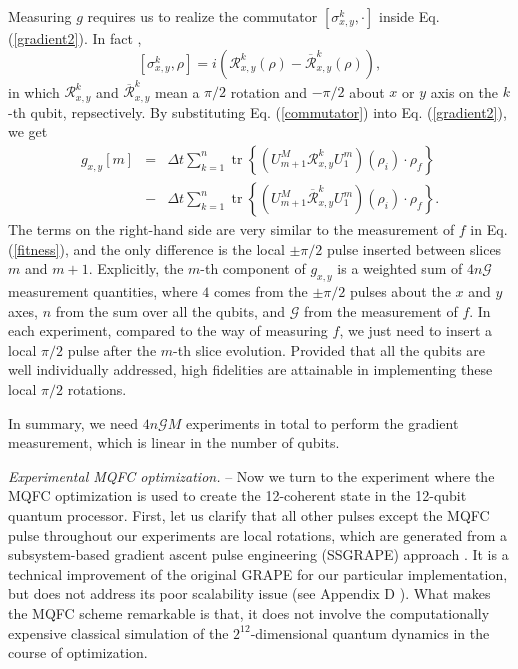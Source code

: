 \documentclass[twocolumn,reprint, amsmath,amssymb,showpacs,superscriptaddress]{revtex4-1}
\newcommand{\bea}{\begin{eqnarray}}
\newcommand{\eea}{\end{eqnarray}}
\begin{document}
Measuring $g$ requires us to  realize the commutator $[\sigma^k_{x,y}, \cdot]$ inside Eq. (\ref{gradient2}). In fact \cite{li2016physical},
\begin{equation}
\left[ \sigma_{x,y}^k,\rho  \right] =  i \left(\mathcal{R}_{x,y}^{k} \left(\rho \right)   - \overline{\mathcal{R}}_{x,y}^{k} \left(\rho \right)  \right),
\label{commutator}
\end{equation}
in which $\mathcal{R}_{x,y}^{k}$ and $\overline{\mathcal{R}}_{x,y}^{k}$ mean a $\pi/2$ rotation and $-\pi/2$ about $x$ or $y$ axis on the $k$-th qubit, repsectively. By substituting Eq. (\ref{commutator}) into Eq. (\ref{gradient2}), we get
\bea
g_{x,y}[m]  & = &    \Delta t \sum\limits_{k = 1}^n  \operatorname{tr}   \left\{  \left(U_{m+1}^{M}   \mathcal{R}_{x,y}^{k} U_{1}^{m}\right)  (\rho _i) \cdot \rho_f \right\}  \nonumber \\
&-&\Delta t  \sum\limits_{k = 1}^n  \operatorname{tr} \left\{ \left(U_{m+1}^{M}  \overline{\mathcal{R}}_{x,y}^{k} U_{1}^{m}\right) (\rho _i)      \cdot \rho_f \right\}.
\label{g}
\eea
The terms on the right-hand side are very similar to the measurement of $f$ in Eq. (\ref{fitness}), and the only difference is the local $\pm \pi/2$ pulse inserted between slices $m$ and $m+1$. Explicitly, the $m$-th component of $g_{x,y}$ is a weighted sum of $4n\mathcal{G}$ measurement quantities, where $4$ comes from the $\pm \pi/2$ pulses about the $x$ and $y$ axes, $n$ from the sum over all the qubits, and $\mathcal{G}$ from the measurement of $f$. In each experiment, compared to the way of measuring $f$, we just need to insert a local $ \pi/2 $ pulse after the $m$-th slice evolution.  Provided that all the qubits are well individually addressed, high fidelities are attainable in implementing these local $ \pi/2 $ rotations.

In summary, we need $4n \mathcal{G}M$ experiments in total to perform the gradient measurement, which is linear in  the number of qubits.

\emph{Experimental MQFC optimization.} -- Now we turn to the experiment where the MQFC optimization is used to create the 12-coherent state in the 12-qubit quantum processor. First, let us clarify that all other pulses except the MQFC pulse throughout our experiments are local rotations, which are generated from a subsystem-based gradient ascent pulse engineering (SSGRAPE) approach \cite{ryan2008liquid}. It is a technical improvement of the original GRAPE for our particular implementation, but does not address its poor scalability issue (see Appendix D \cite{supple}). What makes the MQFC scheme remarkable is that, it does not involve the computationally expensive classical   simulation of the $2^{12}$-dimensional quantum dynamics  in the course of optimization.
\end{document}
